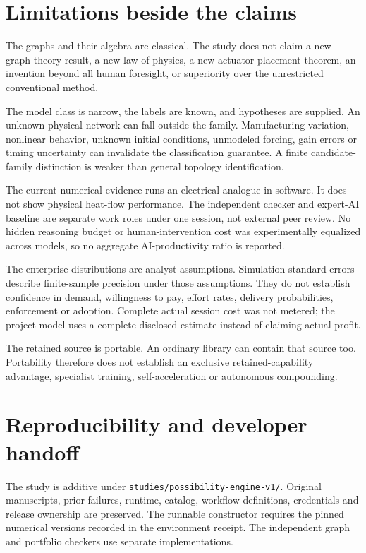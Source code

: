 \documentclass[
  11pt,
]{article}
\begin{document}
\hypertarget{limitations-beside-the-claims}{%
\section{Limitations beside the
claims}\label{limitations-beside-the-claims}}

The graphs and their algebra are classical. The study does not claim a
new graph-theory result, a new law of physics, a new actuator-placement
theorem, an invention beyond all human foresight, or superiority over
the unrestricted conventional method.

The model class is narrow, the labels are known, and hypotheses are
supplied. An unknown physical network can fall outside the family.
Manufacturing variation, nonlinear behavior, unknown initial conditions,
unmodeled forcing, gain errors or timing uncertainty can invalidate the
classification guarantee. A finite candidate-family distinction is
weaker than general topology identification.

The current numerical evidence runs an electrical analogue in software.
It does not show physical heat-flow performance. The independent checker
and expert-AI baseline are separate work roles under one session, not
external peer review. No hidden reasoning budget or human-intervention
cost was experimentally equalized across models, so no aggregate
AI-productivity ratio is reported.

The enterprise distributions are analyst assumptions. Simulation
standard errors describe finite-sample precision under those
assumptions. They do not establish confidence in demand, willingness to
pay, effort rates, delivery probabilities, enforcement or adoption.
Complete actual session cost was not metered; the project model uses a
complete disclosed estimate instead of claiming actual profit.

The retained source is portable. An ordinary library can contain that
source too. Portability therefore does not establish an exclusive
retained-capability advantage, specialist training, self-acceleration or
autonomous compounding.

\hypertarget{reproducibility-and-developer-handoff}{%
\section{Reproducibility and developer
handoff}\label{reproducibility-and-developer-handoff}}

The study is additive under \texttt{studies/possibility-engine-v1/}.
Original manuscripts, prior failures, runtime, catalog, workflow
definitions, credentials and release ownership are preserved. The
runnable constructor requires the pinned numerical versions recorded in
the environment receipt. The independent graph and portfolio checkers
use separate implementations.
\end{document}
